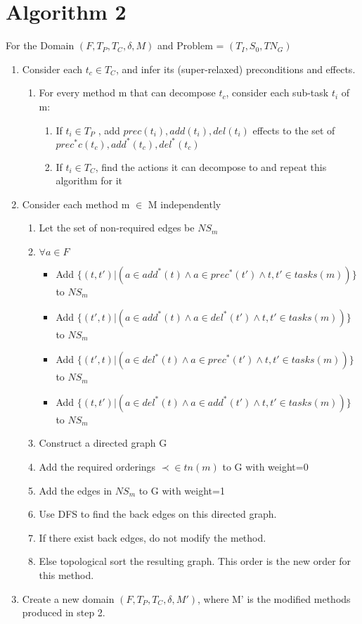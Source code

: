 \section{Algorithm 2}
For the Domain $(F, T_P, T_C, \delta, M)$ and Problem = $(T_I, S_0, TN_G)$
\begin{enumerate}
	\item Consider each $t_c \in T_C$, and infer its (super-relaxed) preconditions and effects.
	\begin{enumerate}
		\item For every method m that can decompose $t_c$, consider each sub-task $t_i$ of m:
		\begin{enumerate}
			\item If $t_i \in T_P$ , add $prec(t_i), add(t_i), del(t_i)$ effects to the set of $prec^{*}c(t_c), add^{*}(t_c), del^{*}(t_c)$
			\item If $t_i \in T_C$, find the actions it can decompose to and repeat this algorithm for it
		\end{enumerate}
	\end{enumerate}
	\item Consider each method m $\in$ M independently
	\begin{enumerate}	
		\item Let the set of non-required edges be $NS_m$
		\item $\forall a \in F$
		\begin{itemize}			
			\item Add $\{ (t, t') |  (a \in add^{*}(t) \land a \in prec^{*}(t') \land t, t' \in tasks(m) ) \}$ to $NS_m$ 
			\item Add $\{ (t', t) |  (a \in add^{*}(t) \land a \in del^{*}(t') \land t, t' \in tasks(m) ) \}$ to $NS_m$ 
			\item Add $\{ (t', t) |  (a \in del^{*}(t) \land a \in prec^{*}(t') \land t, t' \in tasks(m) ) \}$ to $NS_m$ 
			\item Add $\{ (t, t') |  (a \in del^{*}(t) \land a \in add^{*}(t') \land t, t' \in tasks(m) ) \}$ to $NS_m$ 
		\end{itemize}
		\item Construct a directed graph G
		\item Add the required orderings $\prec \in tn(m)$ to G with weight=0
		\item Add the edges in $NS_m$ to G with weight=1 \newline
		\item Use DFS to find the back edges on this directed graph.
		\item If there exist back edges, do not modify the method.
		\item Else topological sort the resulting graph. This order is the new order for this method.
	\end{enumerate}
	\item Create a new domain $(F, T_P, T_C, \delta, M')$, where M' is the modified methods produced in step 2.
\end{enumerate} 


